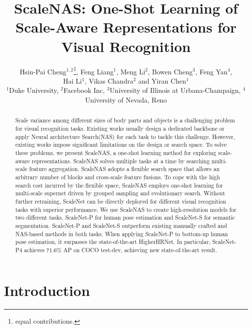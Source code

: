 \documentclass[final]{cvpr}
\newcommand{\workname}{ScaleNAS\xspace}
\newcommand{\netname}{ScaleNet\xspace}
\begin{document}
\title{\workname: One-Shot Learning of Scale-Aware Representations for \\ Visual Recognition}

\author{Hsin-Pai Cheng$^{1,2}$\thanks{equal contributions.}\xspace\xspace, 
Feng Liang$^{1}$\footnotemark[1]\xspace\xspace, Meng Li$^2$, Bowen Cheng$^3$, Feng Yan$^4$, \\
Hai Li$^1$, Vikas Chandra$^2$ and Yiran Chen$^1$\\
$^1$Duke University, $^2$Facebook Inc, $^3$University of Illinois at Urbana-Champaign, $^4$
University of Nevada, Reno\\
}

\maketitle


\begin{abstract}
Scale variance among different sizes of body parts and objects is a challenging problem for visual recognition tasks. 
Existing works usually design a dedicated backbone or apply Neural architecture Search(NAS) for each task to tackle this challenge.
However, existing works impose significant limitations on the design or search space.
To solve these problems, we present \workname, a one-shot learning method for exploring scale-aware representations. 
\workname solves multiple tasks at a time by searching multi-scale feature aggregation. 
\workname adopts a flexible search space that allows an arbitrary number of blocks and cross-scale feature fusions.
To cope with the high search cost incurred by the flexible space, \workname employs one-shot learning for multi-scale supernet driven by grouped sampling and evolutionary search. 
Without further retraining, \netname can be directly deployed for different visual recognition tasks with superior performance.
We use \workname to create high-resolution models for two different tasks,
\netname-P for human pose estimation and \netname-S for semantic segmentation. 
\netname-P and \netname-S outperform existing manually crafted and NAS-based methods in both tasks. 
When applying \netname-P to bottom-up human pose estimation, it surpasses the state-of-the-art HigherHRNet. In particular, \netname-P4 achieves 71.6\% AP on COCO test-dev, achieving new state-of-the-art result. 

\end{abstract}
\section{Introduction}
\end{document}
